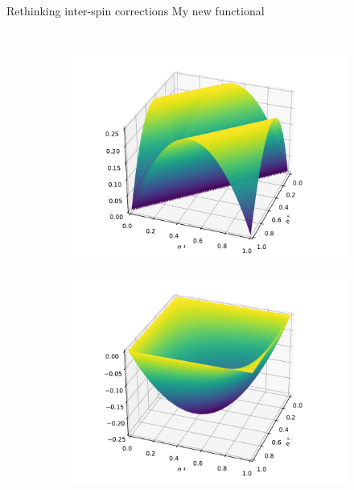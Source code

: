 \documentclass[xcolor=table,aspectratio=169]{beamer}
\numberwithin{equation}{section}
\begin{document}
\begin{frame}{Rethinking inter-spin corrections}
    My new functional
    \footnotesize
    \begin{columns}
        \begin{figure}
            \centering
            \begin{subfigure}[b]{\columnwidth}
                \includegraphics[width=\columnwidth]{figures/novel_u_correction_equal.pdf}
            \end{subfigure}
            \begin{subfigure}[b]{\columnwidth}
                \includegraphics[width=\columnwidth]{figures/novel_k_correction.pdf}
            \end{subfigure}

\end{figure}
\end{columns}
\end{frame}
\end{document}
